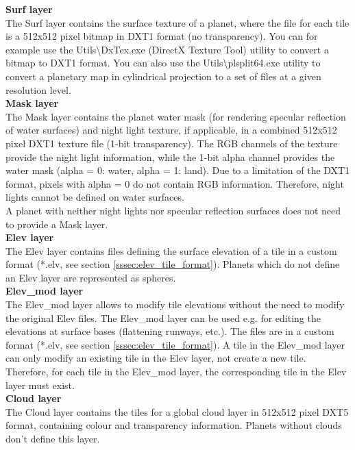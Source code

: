 \documentclass[Orbiter Developer Manual.tex]{subfiles}
\begin{document}
\noindent
\textbf{Surf layer}\\
The Surf layer contains the surface texture of a planet, where the file for each tile is a 512x512 pixel bitmap in DXT1 format (no transparency). You can for example use the Utils\textbackslash DxTex.exe (DirectX Texture Tool) utility to convert a bitmap to DXT1 format. You can also use the Utils\textbackslash plsplit64.exe utility to convert a planetary map in cylindrical projection to a set of files at a given resolution level.\\

\noindent
\textbf{Mask layer}\\
The Mask layer contains the planet water mask (for rendering specular reflection of water surfaces) and night light texture, if applicable, in a combined  512x512 pixel DXT1 texture file (1-bit transparency). The RGB channels of the texture provide the night light information, while the 1-bit alpha channel provides the water mask (alpha = 0: water, alpha = 1: land). Due to a limitation of the DXT1 format, pixels with alpha = 0 do not contain RGB information. Therefore, night lights cannot be defined on water surfaces.\\
A planet with neither night lights nor specular reflection surfaces does not need to provide a Mask layer.\\

\noindent
\textbf{Elev layer}\\
The Elev layer contains files defining the surface elevation of a tile in a custom format (*.elv, see section \ref{sssec:elev_tile_format}). Planets which do not define an Elev layer are represented as spheres.\\

\noindent
\textbf{Elev\_mod layer}\\
The Elev\_mod layer allows to modify tile elevations without the need to modify the original Elev files. The Elev\_mod layer can be used e.g. for editing the elevations at surface bases (flattening runways, etc.). The files are in a custom format (*.elv, see section \ref{sssec:elev_tile_format}). A tile in the Elev\_mod layer can only modify an existing tile in the Elev layer, not create a new tile. Therefore, for each tile in the Elev\_mod layer, the corresponding tile in the Elev layer must exist.\\

\noindent
\textbf{Cloud layer}\\
The Cloud layer contains the tiles for a global cloud layer in 512x512 pixel DXT5 format, containing colour and transparency information. Planets without clouds don't define this layer.\\
\end{document}
